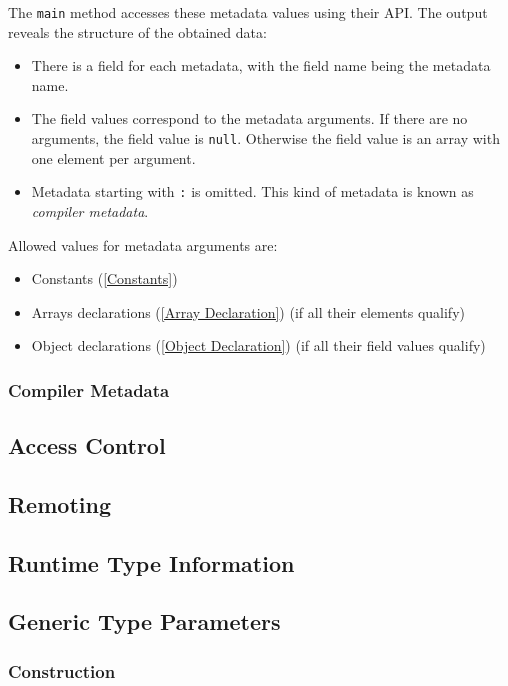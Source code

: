 \documentclass{article}
\newcommand{\expr}[1]{\texttt{#1}}
\begin{document}
The \expr{main} method accesses these metadata values using their API. The output reveals the structure of the obtained data:

\begin{itemize}
	\item There is a field for each metadata, with the field name being the metadata name.
	\item The field values correspond to the metadata arguments. If there are no arguments, the field value is \expr{null}. Otherwise the field value is an array with one element per argument.
	\item Metadata starting with \expr{:} is omitted. This kind of metadata is known as \emph{compiler metadata}.
\end{itemize}

Allowed values for metadata arguments are:

\begin{itemize}
	\item Constants (\ref{Constants})
	\item Arrays declarations (\ref{Array Declaration}) (if all their elements qualify)
	\item Object declarations (\ref{Object Declaration}) (if all their field values qualify)
\end{itemize}

\subsubsection{Compiler Metadata}

\subsection{Access Control}
\label{Access Control}


\subsection{Remoting}

\subsection{Runtime Type Information}

\subsection{Generic Type Parameters}

\subsubsection{Construction}
\end{document}
